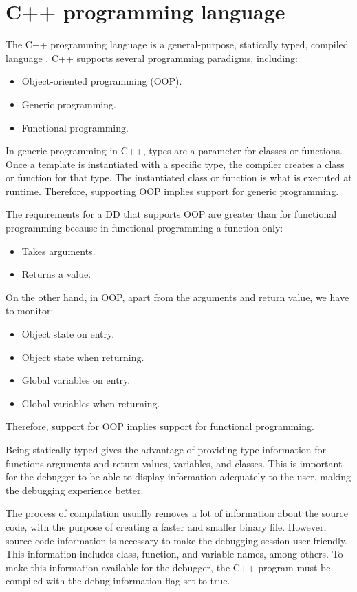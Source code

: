 \section{C++ programming language}
The C++ programming language is a general-purpose, statically typed, compiled language \cite{cppHistory}.
%
C++ supports several programming paradigms, including:

\begin{itemize}
    \item Object-oriented programming (OOP).
    \item Generic programming.
    \item Functional programming.
\end{itemize}

In generic programming in C++, types are a parameter for classes or functions.
Once a template is instantiated with a specific type, the compiler creates a class or function for that type.
The instantiated class or function is what is executed at runtime. Therefore, supporting OOP implies support for generic programming.

The requirements for a DD that supports OOP are greater than for functional programming because in functional programming a function only:
\begin{itemize}
    \item Takes arguments.
    \item Returns a value.
\end{itemize}
On the other hand, in OOP, apart from the arguments and return value, we have to monitor:
\begin{itemize}
    \item Object state on entry.
    \item Object state when returning.
    \item Global variables on entry.
    \item Global variables when returning.
\end{itemize}
Therefore, support for OOP implies support for functional programming.

Being statically typed gives the advantage of providing type information for functions arguments and return values, variables, and classes. This is important for the debugger to be able to display information adequately to the user, making the debugging experience better.

The process of compilation usually removes a lot of information about the source code, with the purpose of creating a faster and smaller binary file.
However, source code information is necessary to make the debugging session user friendly. This information includes class, function, and variable names, among others.
To make this information available for the debugger, the C++ program must be compiled with the debug information flag set to true.

